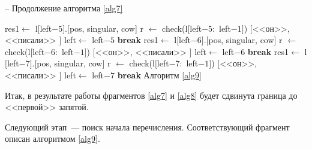 \documentclass[main]{subfiles}
\begin{document}
\begin{algorithm}
	\caption{-- Продолжение алгоритма \ref{alg7}}\label{alg8}
	\begin{algorithmic}[1]
			\EndIf
		\EndIf
			\EndFor
		\State  res1$\gets$ l$[$left$-5]$.[pos, singular, cow]
			\State r $\gets$ check(l$[$left$-5:$ left$-1 ]$)
			\State \Return $[$<<он>>, <<писали>> $]$
			\State left$\gets$ left$-5$
		\State \textbf{break}
		\EndIf
			\EndIf
		\EndFor
		\State  res1$\gets$ l$[$left$-6]$.[pos, singular, cow]
		\State r $\gets$ check(l$[$left$-6:$ left$-1 ]$)
		\State \Return $[$<<он>>, <<писали>> $]$
		\State left$\gets$ left$-6$
		\State \textbf{break}
		\EndIf
		\EndIf
		\EndFor
		\State  res1$\gets$ l$[$left$-7]$.[pos, singular, cow]
		\State r $\gets$ check(l$[$left$-7:$ left$-1 ]$)
		\State \Return $[$<<он>>, <<писали>> $]$
		\State left$\gets$ left$-7$
		\State \textbf{break}
		\EndIf
		\EndIf
		\EndFor
		\Else \State Алгоритм \ref{alg9}
		\EndIf
			\EndWhile
	\end{algorithmic}
\end{algorithm}
\newpage

Итак, в результате работы фрагментов \ref{alg7} и \ref{alg8} будет сдвинута граница до <<первой>> запятой.

Следующий этап~--- поиск начала перечисления. Соответствующий фрагмент описан алгоритмом \ref{alg9}.
\end{document}
